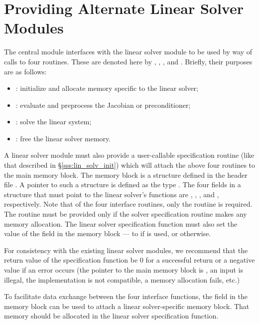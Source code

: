 \chapter{Providing Alternate Linear Solver Modules}\label{s:new_linsolv}
The central {\kinsol} module interfaces with the linear solver module 
to be used by way of calls to four routines.  These are denoted here by 
, , , and .
Briefly, their purposes are as follows:
\begin{itemize}
\item {}: initialize and allocate memory specific to the
  linear solver;
\item {}: evaluate and preprocess the Jacobian or preconditioner;
\item {}: solve the linear system;
\item {}: free the linear solver memory.
\end{itemize}
A linear solver module must also provide a user-callable specification
routine (like that described in \S\ref{sss:lin_solv_init}) which will
attach the above four routines to the main {\kinsol} memory block.
The {\kinsol} memory block is a structure defined in the header file
. A pointer to such a structure is defined as the
type . The four fields in a  structure that
must point to the linear solver's functions are ,
, , and , respectively.
Note that of the four interface routines, only the  routine
is required. The  routine must be provided only if the solver
specification routine makes any memory allocation.
The linear solver specification function must also set the value of
the field  in the {\kinsol} memory block --- to
 if  is used, or  otherwise.

For consistency with the existing {\kinsol} linear solver modules, we
recommend that the return value of the specification function be $0$ for
a successful return or a negative value if an error occurs (the
pointer to the main {\kinsol} memory block is , an input is
illegal, the {\nvector} implementation is not compatible, a memory
allocation fails, etc.)

To facilitate data exchange between the four interface functions, the
field  in the {\kinsol} memory block can be used to attach
a linear solver-specific memory block.
That memory should be allocated in the linear solver specification function.

